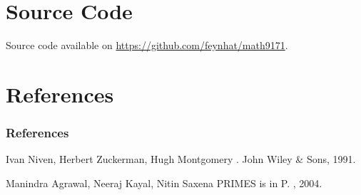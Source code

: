 \documentclass[11pt]{beamer}
\begin{document}
\section{Source Code}

\begin{frame}
  Source code available on \url{https://github.com/feynhat/math9171}.
\end{frame}

\section{References}
\begin{frame}
\frametitle{References}
\begin{thebibliography}{10}

  \beamertemplatebookbibitems

    Ivan Niven, Herbert Zuckerman, Hugh Montgomery
    .
    \newblock John Wiley \& Sons, 1991.

  \beamertemplatearticlebibitems

    Manindra Agrawal, Neeraj Kayal, Nitin Saxena
    \newblock PRIMES is in P.
    , 2004.
  \end{thebibliography}
\end{frame}
\end{document}
